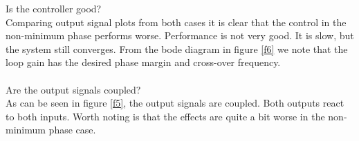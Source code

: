 \documentclass[a4paper,11pt]{article}
\begin{document}
	Is the controller good?
	\\Comparing output signal plots from both cases it is clear that the control in the non-minimum phase performs worse. Performance is not very good. It is slow, but the system still converges. From the bode diagram in figure \ref{f6} we note that the loop gain has the desired phase margin and cross-over frequency.\\\\
	Are the output signals coupled?
	\\As can be seen in figure \ref{f5}, the output signals are coupled. Both outputs react to both inputs. Worth noting is that the effects are quite a bit worse in the non-minimum phase case. 
\end{document}
